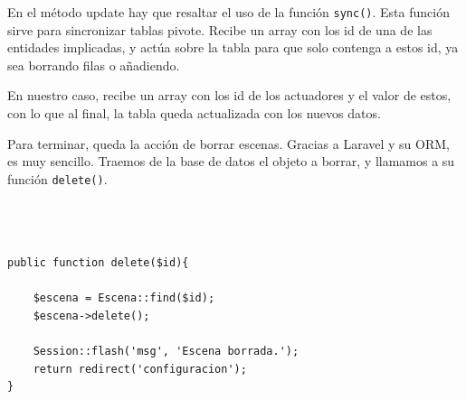 En el método update hay que resaltar el uso de la función \lstinline|sync()|. Esta función sirve para sincronizar tablas pivote. Recibe un array con los id de una de las entidades implicadas, y actúa sobre la tabla para que solo contenga a estos id, ya sea borrando filas o añadiendo.

En nuestro caso, recibe un array con los id de los actuadores y el valor de estos, con lo que al final, la tabla queda actualizada con los nuevos datos.


Para terminar, queda la acción de borrar escenas. Gracias a Laravel y su ORM, es muy sencillo. Traemos de la base de datos el objeto a borrar, y llamamos a su función \lstinline|delete()|.
\begin{lstlisting}



public function delete($id){

    $escena = Escena::find($id);
    $escena->delete();

    Session::flash('msg', 'Escena borrada.');
    return redirect('configuracion');
}
   \end{lstlisting}
   
   
   
   
   
    
    
    
    
    
    
    
  
  
  
  
  
  
  
 
 









